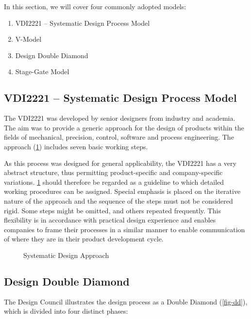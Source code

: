 In this section, we will cover four commonly adopted models:

\begin{enumerate}
  \item VDI2221 -- Systematic Design Process Model
  \item V-Model
  \item Design Double Diamond
  \item Stage-Gate Model
\end{enumerate}


\subsection{VDI2221 -- Systematic Design Process Model}

The \acf{VDI2221} was developed by senior designers from industry and academia. The aim was to provide a generic approach for the design of products within the fields of mechanical, precision, control, software and process engineering. The approach (\cref{fig-vdi}) includes seven basic working steps.

As this process was designed for general applicability, the \ac{VDI2221} has a very abstract structure, thus permitting product-specific and company-specific variations. \cref{fig-vdi} should therefore be regarded as a guideline to which detailed working procedures can be assigned. Special emphasis is placed on the iterative nature of the approach and the sequence of the steps must not be considered rigid. Some steps might be omitted, and others repeated frequently. This flexibility is in accordance with practical design experience and enables companies to frame their processes in a similar manner to enable communication of where they are in their product development cycle.

\begin{figure}[h!]
    \centering
    
    \caption[Systematic Design Approach]{Systematic Design Approach~\citep{pahl2013}}\label{fig-vdi}
\end{figure}



\subsection{Design Double Diamond}

The Design Council\cite{council2007} illustrates the design process as a Double Diamond (\cref{fig-dd}), which is divided into four distinct phases:

